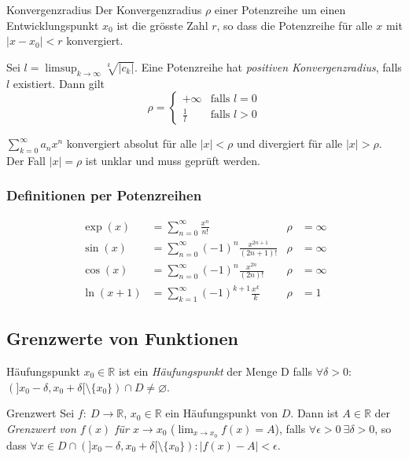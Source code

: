 \documentclass[a4paper,10pt]{article}
\def\sumk{\sum_{k=1}^\infty}
\def\sumn{\sum_{n=0}^\infty}
\def\R{\mathbb{R}}
\begin{document}
\begin{mainbox}{Konvergenzradius}
 Der Konvergenzradius $\rho$ einer Potenzreihe um einen Entwicklungspunkt $x_0$ ist die grösste Zahl $r$, so dass die Potenzreihe für alle $x$ mit $|x - x_0| < r$ konvergiert.
 
 Sei $l = \limsup_{k \to \infty} \sqrt[k]{|c_k|}$. Eine Potenzreihe hat \emph{positiven Konvergenzradius}, falls $l$ existiert. Dann gilt
 \[ \rho = \begin{cases}
     +\infty & \text{falls } l = 0 \\
     \frac{1}{l} & \text{falls } l > 0
 \end{cases} \]
\end{mainbox}
$\sum_{k=0}^\infty a_n x^n$ konvergiert absolut für alle $|x| < \rho$ und divergiert für alle $|x| > \rho$. Der Fall $|x| = \rho$ ist unklar und muss geprüft werden.
\subsubsection{Definitionen per Potenzreihen}
\begin{align*}
\exp(x) &= \sumn \frac{x^n}{n!} & \rho &= \infty \\
\sin(x) &= \sumn (-1)^n \frac{x^{2n + 1}}{(2n + 1)!} & \rho &= \infty \\
\cos(x) &= \sumn (-1)^n \frac{x^{2n}}{(2n)!} & \rho &= \infty \\
\ln(x + 1) &= \sumk (-1)^{k+1} \frac{x^k}{k} & \rho &= 1
\end{align*}

\subsection{Grenzwerte von Funktionen}
\begin{subbox}{Häufungspunkt}
 $x_0 \in \R$ ist ein \emph{Häufungspunkt} der Menge D falls $\forall \delta > 0$: $(]x_0 - \delta, x_0 + \delta[ \setminus \{x_0\}) \cap D \ne \varnothing$.
\end{subbox}

\begin{mainbox}{Grenzwert}
 Sei $f: \: D \to \R$, $x_0 \in \R$ ein Häufungspunkt von $D$. Dann ist $A \in \R$ der \emph{Grenzwert von $f(x)$ für $x \to x_0$} ($\lim_{x\to x_0} f(x) = A$), falls $\forall \epsilon > 0 \ \exists \delta > 0$, so dass $\forall x \in D \cap (]x_0 - \delta, x_0 + \delta[ \setminus \{x_0\}): |f(x) - A| < \epsilon$.
\end{mainbox}
\end{document}
